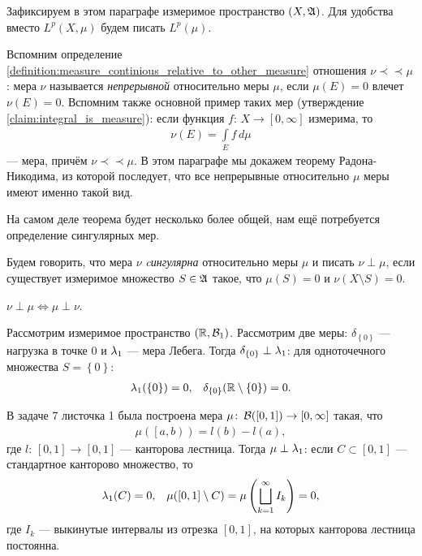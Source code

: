 Зафиксируем в этом параграфе измеримое пространство $(X, \mathfrak{A})$. Для удобства вместо $L^{p}(X,\mu)$ будем писать $L^{p}(\mu)$.

Вспомним определение \ref{definition:measure_continious_relative_to_other_measure} отношения $\nu \prec \prec \mu$: мера $\nu$ называется \textit{непрерывной} относительно меры $\mu$, если $\mu(E) = 0$ влечет $\nu(E) = 0$. Вспомним также основной пример таких мер (утверждение \ref{claim:integral_is_measure}): если функция $f \colon\, X \to [0,\infty]$ измерима, то
\begin{align*}
 \nu(E) = \int\limits_{E} f \,d\mu 
\end{align*} --- мера, причём $\nu \prec \prec \mu$. В этом параграфе мы докажем теорему Радона-Никодима, из которой последует, что все непрерывные относительно $\mu$ меры имеют именно такой вид.

На самом деле теорема будет несколько более общей, нам ещё потребуется определение сингулярных мер.

\begin{df}
 Будем говорить, что мера $\nu$ \textit{cингулярна} относительно меры $\mu$ и писать $\nu \perp \mu$, если существует измеримое множество $S \in \mathfrak{A}$ такое, что $\mu(S) = 0$ и  $\nu(X \setminus S) = 0$.
\end{df}
\begin{remrk*}
 $\nu \perp \mu \iff \mu \perp \nu$.
\end{remrk*}

\begin{exmpl*}
 Рассмотрим измеримое пространство $(\mathbb{R}, \mathcal{B}_1)$. Рассмотрим две меры: $\delta_{\left\{ 0 \right\}}$ --- нагрузка в точке $0$ и $\lambda_{1}$ --- мера Лебега. Тогда $\delta_{\left\{ 0 \right\}} \perp \lambda_{1}$: для одноточечного множества $S = \left\{ 0 \right\}$:
 \begin{align*}
  \lambda_{1}(\left\{ 0 \right\}) = 0, & &\delta_{\left\{ 0 \right\}}(\mathbb{R} \setminus \left\{ 0 \right\}) = 0
 .\end{align*} 
\end{exmpl*}
\begin{exmpl*}
 В задаче 7 листочка 1 была построена мера $\mu \colon\, \mathcal{B}([0,1]) \to [0,\infty]$ такая, что
 \begin{align*}
  \mu( \left[a, b\right) ) = l(b) - l(a)
 ,\end{align*} где $l \colon\, [0,1] \to [0,1]$  --- канторова лестница. Тогда $\mu \perp \lambda_{1} $: если $C \subset [0,1]$  --- стандартное канторово множество, то
 \begin{align*}
  \lambda_{1}(C) = 0, & &\mu([0,1] \setminus C) = \mu \left( \bigsqcup_{k=1}^{\infty} I_k \right) = 0
 ,\end{align*} где $I_k$ --- выкинутые интервалы из отрезка $[0,1]$, на которых канторова лестница постоянна.
\end{exmpl*}

